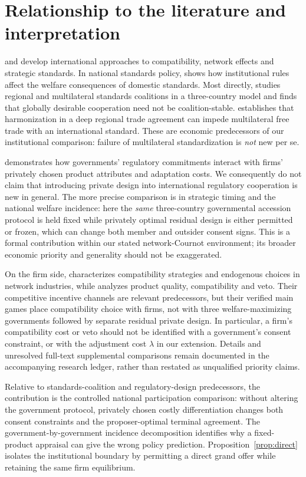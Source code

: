 \documentclass[11pt,a4paper]{article}
\theoremstyle{remark}\newtheorem{remark}[theorem]{Remark}
\begin{document}
\section{Relationship to the literature and interpretation}\label{sec:literature}
\citet{GandalShy2001} and \citet{Klimenko2009} develop international approaches to compatibility, network effects and strategic standards. In national standards policy, \citet{Costinot2008} shows how institutional rules affect the welfare consequences of domestic standards. Most directly, \citet{Takarada2020} studies regional and multilateral standards coalitions in a three-country model and finds that globally desirable cooperation need not be coalition-stable. \citet{Kawabata2021} establishes that harmonization in a deep regional trade agreement can impede multilateral free trade with an international standard. These are economic predecessors of our institutional comparison: failure of multilateral standardization is \emph{not} new per se.

\citet{Grossman2021} demonstrates how governments' regulatory commitments interact with firms' privately chosen product attributes and adaptation costs. We consequently do not claim that introducing private design into international regulatory cooperation is new in general. The more precise comparison is in strategic timing and the national welfare incidence: here the \emph{same} three-country governmental accession protocol is held fixed while privately optimal residual design is either permitted or frozen, which can change both member and outsider consent signs. This is a formal contribution within our stated network-Cournot environment; its broader economic priority and generality should not be exaggerated.

On the firm side, \citet{Buccella2023} characterizes compatibility strategies and endogenous choices in network industries, while \citet{Cheng2025} analyzes product quality, compatibility and veto. Their competitive incentive channels are relevant predecessors, but their verified main games place compatibility choice with firms, not with three welfare-maximizing governments followed by separate residual private design. In particular, a firm's compatibility cost or veto should not be identified with a government's consent constraint, or with the adjustment cost $\lambda$ in our extension. Details and unresolved full-text supplemental comparisons remain documented in the accompanying research ledger, rather than restated as unqualified priority claims.

Relative to standards-coalition and regulatory-design predecessors, the contribution is the controlled national participation comparison: without altering the government protocol, privately chosen costly differentiation changes both consent constraints and the proposer-optimal terminal agreement. The government-by-government incidence decomposition identifies why a fixed-product appraisal can give the wrong policy prediction. Proposition~\ref{prop:direct} isolates the institutional boundary by permitting a direct grand offer while retaining the same firm equilibrium.
\end{document}
